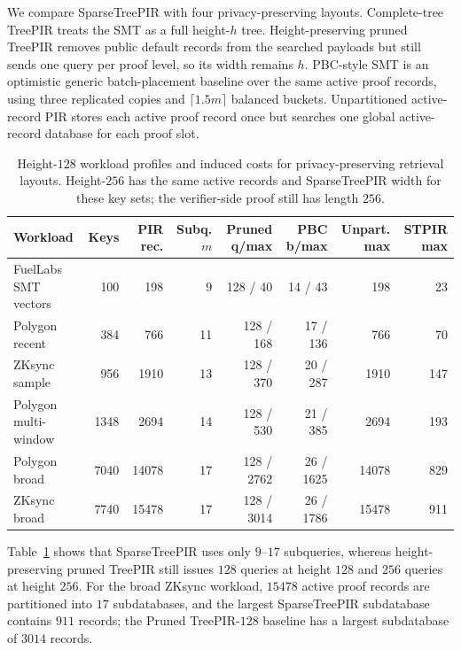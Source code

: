 We compare SparseTreePIR with four privacy-preserving layouts. Complete-tree TreePIR treats the SMT as a full height-$h$ tree. Height-preserving pruned TreePIR removes public default records from the searched payloads but still sends one query per proof level, so its width remains $h$. PBC-style SMT is an optimistic generic batch-placement baseline over the same active proof records, using three replicated copies and $\lceil1.5m\rceil$ balanced buckets. Unpartitioned active-record PIR stores each active proof record once but searches one global active-record database for each proof slot.

\begin{table}[!t]
\centering
\caption{Height-$128$ workload profiles and induced costs for privacy-preserving retrieval layouts. Height-$256$ has the same active records and SparseTreePIR width for these key sets; the verifier-side proof still has length $256$.}
\label{tab:real_workload_shape}
\scriptsize
\setlength{\tabcolsep}{4pt}
\begin{tabular}{lrrrrrrr}
\toprule
Workload & Keys & PIR rec. & Subq. $m$ & Pruned q/max & PBC b/max & Unpart. max & STPIR max \\
\midrule
FuelLabs SMT vectors & 100   & 198   & 9  & 128 / 40   & 14 / 43   & 198   & 23 \\
Polygon recent       & 384   & 766   & 11 & 128 / 168  & 17 / 136  & 766   & 70 \\
ZKsync sample        & 956   & 1910  & 13 & 128 / 370  & 20 / 287  & 1910  & 147 \\
Polygon multi-window & 1348  & 2694  & 14 & 128 / 530  & 21 / 385  & 2694  & 193 \\
Polygon broad        & 7040  & 14078 & 17 & 128 / 2762 & 26 / 1625 & 14078 & 829 \\
ZKsync broad         & 7740  & 15478 & 17 & 128 / 3014 & 26 / 1786 & 15478 & 911 \\
\bottomrule
\end{tabular}
\end{table}

Table~\ref{tab:real_workload_shape} shows that SparseTreePIR uses only $9$--$17$ subqueries, whereas height-preserving pruned TreePIR still issues $128$ queries at height $128$ and $256$ queries at height $256$. For the broad ZKsync workload, $15478$ active proof records are partitioned into $17$ subdatabases, and the largest SparseTreePIR subdatabase contains $911$ records; the Pruned TreePIR-$128$ baseline has a largest subdatabase of $3014$ records.

